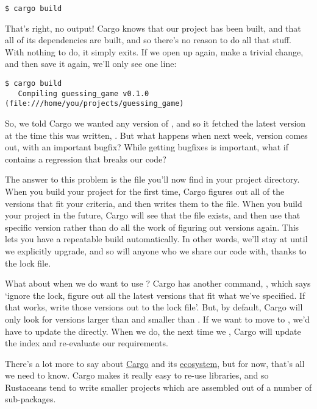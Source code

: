 \begin{verbatim}
$ cargo build
\end{verbatim}

That’s right, no output! Cargo knows that our project has been built, and that all of its dependencies are built, and so there’s 
no reason to do all that stuff. With nothing to do, it simply exits. If we open up  again, make a trivial 
change, and then save it again, we’ll only see one line:

\begin{verbatim}
$ cargo build
   Compiling guessing_game v0.1.0 (file:///home/you/projects/guessing_game)
\end{verbatim}

So, we told Cargo we wanted any  version of , and so it fetched the latest version at the time this was
written, . But what happens when next week, version  comes out, with an important bugfix? While getting
bugfixes is important, what if  contains a regression that breaks our code?

\blank

The answer to this problem is the  file you’ll now find in your project directory. When you build your project 
for the first time, Cargo figures out all of the versions that fit your criteria, and then writes them to the 
file. When you build your project in the future, Cargo will see that the  file exists, and then use that specific
version rather than do all the work of figuring out versions again. This lets you have a repeatable build automatically. In other
words, we’ll stay at  until we explicitly upgrade, and so will anyone who we share our code with, thanks to the lock 
file.

\blank

What about when we do want to use ? Cargo has another command, , which says ‘ignore the lock, figure out
all the latest versions that fit what we’ve specified. If that works, write those versions out to the lock file’. But, by default,
Cargo will only look for versions larger than  and smaller than . If we want to move to , we’d
have to update the  directly. When we do, the next time we , Cargo will update the index and 
re-evaluate our  requirements.

\blank

There’s a lot more to say about \href{http://doc.crates.io/}{Cargo} and its \href{http://doc.crates.io/crates-io.html}{ecosystem},
but for now, that’s all we need to know. Cargo makes it really easy to re-use libraries, and so Rustaceans tend to write smaller
projects which are assembled out of a number of sub-packages.


